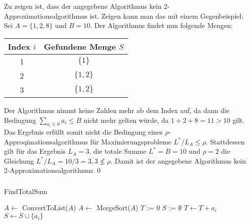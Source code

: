 \documentclass[a4paper]{article}
\begin{document}
	\maketitle
	\section{}
		\subsubsection{}
		Zu zeigen ist, dass der angegebene Algorithmus kein 2-Approximationsalgorithmus ist. Zeigen kann man das mit einem Gegenbeispiel:\n
		Sei $A=\{1, 2, 8\}$ und $B=10$. Der Algorithmus findet nun folgende Mengen:
		\begin{center}
			\begin{tabular}{c|c}
				Index $i$ & Gefundene Menge $S$\\\hline
				1 & $\{1\}$\\
				2 & $\{1, 2\}$\\
				3 & $\{1, 2\}$\\
			\end{tabular}
		\end{center}
		Der Algorithmus nimmt keine Zahlen mehr ab dem Index auf, da dann die Bedingung $\sum\limits_{a_i\in S} a_i\leq B$ nicht mehr gelten würde, da $1+2+8=11>10$ gilt.\n
		Das Ergebnis erfüllt somit nicht die Bedingung eines $\rho$-Approqimationsalgorithmus für Maximierungsprobleme $L^*/L_A\leq \rho$. Stattdessen gilt für das Ergebnis $L_A=3$, die totale Summe $L^*=B=10$ und $\rho=2$ die Gleichung $L^*/L_A=10/3=\overline{3,3}\not\leq\rho$.\n
		Damit ist der angegebene Algorithmus kein 2-Approximationsalgorithmus.\qed
		\subsubsection{}
		\begin{breakablealgorithm}
			\caption{FindTotalSum}
			\begin{algorithmic}[1]
					\State $A \leftarrow$ ConvertToList($A$)
					\State $A \leftarrow$ MergeSort($A$)
					\State $T$ := 0
					\State $S$ := $\emptyset$
							\State $T\leftarrow T+a_i$
							\State $S\leftarrow S\cup \{a_i\}$
						\EndIf
					\EndFor
				\EndProcedure
			\end{algorithmic}
		\end{breakablealgorithm}
\end{document}
